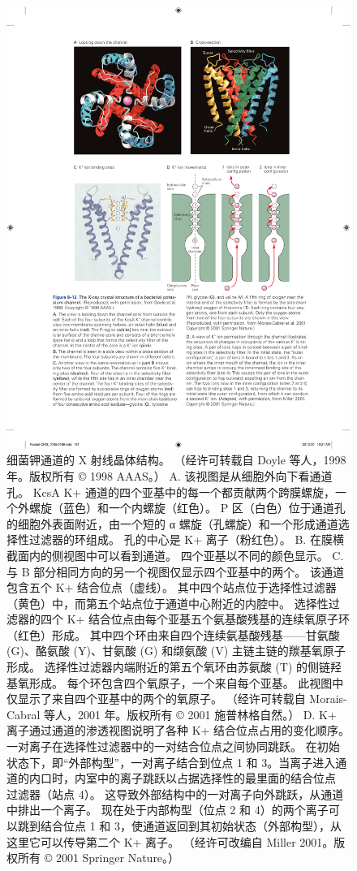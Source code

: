 \begin{figure}[htbp]
	\centering
	\includegraphics[width=0.7\linewidth]{chap08/fig_8_12}
	\caption{细菌钾通道的 X 射线晶体结构。 （经许可转载自 Doyle 等人，1998 年。版权所有 © 1998 AAAS。） A. 该视图是从细胞外向下看通道孔。 KcsA K+ 通道的四个亚基中的每一个都贡献两个跨膜螺旋，一个外螺旋（蓝色）和一个内螺旋（红色）。 P 区（白色）位于通道孔的细胞外表面附近，由一个短的 α 螺旋（孔螺旋）和一个形成通道选择性过滤器的环组成。 孔的中心是 K+ 离子（粉红色）。 B. 在膜横截面内的侧视图中可以看到通道。 四个亚基以不同的颜色显示。 C. 与 B 部分相同方向的另一个视图仅显示四个亚基中的两个。 该通道包含五个 K+ 结合位点（虚线）。 其中四个站点位于选择性过滤器（黄色）中，而第五个站点位于通道中心附近的内腔中。 选择性过滤器的四个 K+ 结合位点由每个亚基五个氨基酸残基的连续氧原子环（红色）形成。 其中四个环由来自四个连续氨基酸残基——甘氨酸 (G)、酪氨酸 (Y)、甘氨酸 (G) 和缬氨酸 (V) 主链主链的羰基氧原子形成。 选择性过滤器内端附近的第五个氧环由苏氨酸 (T) 的侧链羟基氧形成。 每个环包含四个氧原子，一个来自每个亚基。 此视图中仅显示了来自四个亚基中的两个的氧原子。 （经许可转载自 Morais-Cabral 等人，2001 年。版权所有 © 2001 施普林格自然。） D. K+ 离子通过通道的渗透视图说明了各种 K+ 结合位点占用的变化顺序。 一对离子在选择性过滤器中的一对结合位点之间协同跳跃。 在初始状态下，即“外部构型”，一对离子结合到位点 1 和 3。当离子进入通道的内口时，内室中的离子跳跃以占据选择性的最里面的结合位点 过滤器（站点 4）。 这导致外部结构中的一对离子向外跳跃，从通道中排出一个离子。 现在处于内部构型（位点 2 和 4）的两个离子可以跳到结合位点 1 和 3，使通道返回到其初始状态（外部构型），从这里它可以传导第二个 K+ 离子。 （经许可改编自 Miller 2001。版权所有 © 2001 Springer Nature。）}
	\label{fig:8_12}
\end{figure}


